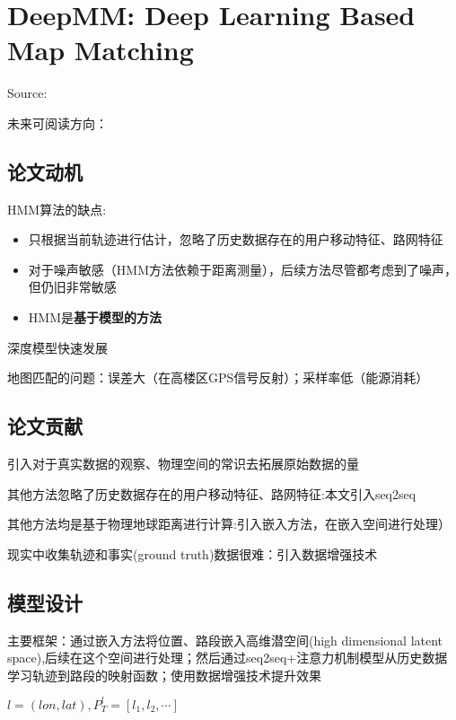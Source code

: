 \chapter{DeepMM: Deep Learning Based Map Matching}

Source: \cite{Feng2020}

未来可阅读方向： \cite{Gong2018, Jagadeesh2014, Yang2018, Lou2009}

\section{论文动机}

HMM算法的缺点:
\label{Problem:PureHMM2}
\begin{itemize}
    \item 只根据当前轨迹进行估计，忽略了历史数据存在的用户移动特征、路网特征
    \item 对于噪声敏感（HMM方法依赖于距离测量），后续方法尽管都考虑到了噪声，但仍旧非常敏感
    \item  HMM是\textbf{基于模型的方法}
\end{itemize}

深度模型快速发展

地图匹配的问题：误差大（在高楼区GPS信号反射）；采样率低（能源消耗）

\section{论文贡献}

引入对于真实数据的观察、物理空间的常识去拓展原始数据的量

其他方法忽略了历史数据存在的用户移动特征、路网特征:本文引入seq2seq

其他方法均是基于物理地球距离进行计算:引入嵌入方法，在嵌入空间进行处理）

现实中收集轨迹和事实(ground truth)数据很难：引入数据增强技术


\section{模型设计}

主要框架：通过嵌入方法将位置、路段嵌入高维潜空间(high dimensional latent space),后续在这个空间进行处理；然后通过seq2seq+注意力机制模型从历史数据学习轨迹到路段的映射函数；使用数据增强技术提升效果

\begin{definition}[基于GPS的轨迹]
   $ l = (lon, lat), P_T^l = [l_1, l_2, \cdots]$
\end{definition}

